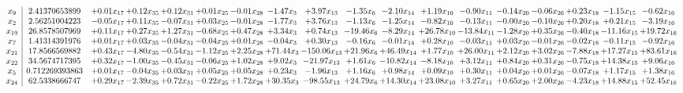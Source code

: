 \documentclass[9pt]{article}
\begin{document}
 \[\begin{array}{c| c c@{\hskip 2pt} c@{\hskip 2pt} c@{\hskip 2pt} c@{\hskip 2pt} c@{\hskip 2pt} c@{\hskip 2pt} c@{\hskip 2pt} c@{\hskip 2pt} c@{\hskip 2pt} c@{\hskip 2pt} c@{\hskip 2pt} c@{\hskip 2pt} c@{\hskip 2pt} c@{\hskip 2pt} c@{\hskip 2pt} c@{\hskip 2pt} }
 x_{9}   &  2.41370653899 & +  0.01 x_{17} & +  0.12 x_{35} & +  0.12 x_{31} & +  0.01 x_{25} & -0.01 x_{28} & -1.47 x_{3} & +  3.97 x_{13} & -1.35 x_{6} & -2.10 x_{14} & +  1.19 x_{10} & -0.90 x_{11} & -0.14 x_{20} & -0.06 x_{26} & +  0.23 x_{18} & -1.15 x_{15} & -0.62 x_{16}\\
 x_{2}   &  2.56251004223 & -0.05 x_{17} & +  0.11 x_{35} & -0.07 x_{31} & +  0.03 x_{25} & -0.01 x_{28} & -1.77 x_{3} & +  3.76 x_{13} & -1.13 x_{6} & -1.25 x_{14} & -0.82 x_{10} & -0.13 x_{11} & -0.00 x_{20} & -0.10 x_{26} & +  0.20 x_{18} & +  0.21 x_{15} & -3.19 x_{16}\\
 x_{19}   &  26.8578507969 & +  0.11 x_{17} & +  0.27 x_{35} & +  1.27 x_{31} & -0.68 x_{25} & +  0.47 x_{28} & +  3.34 x_{3} & +  0.74 x_{13} & -19.46 x_{6} & -8.29 x_{14} & + 26.78 x_{10} & -13.84 x_{11} & -1.28 x_{20} & +  0.35 x_{26} & -0.40 x_{18} & -11.16 x_{15} & + 19.72 x_{16}\\
 x_{7}   &  1.41314391976 & +  0.01 x_{17} & +  0.03 x_{35} & -0.04 x_{31} & -0.04 x_{25} & +  0.01 x_{28} & -0.04 x_{3} & +  0.30 x_{13} & -0.16 x_{6} & -0.01 x_{14} & +  0.28 x_{10} & -0.03 x_{11} & +  0.03 x_{20} & -0.01 x_{26} & -0.02 x_{18} & -0.11 x_{15} & -0.92 x_{16}\\
 x_{21}   &  17.8566569882 & +  0.43 x_{17} & -4.80 x_{35} & -0.54 x_{31} & -1.12 x_{25} & +  2.25 x_{28} & + 71.44 x_{3} & -150.06 x_{13} & + 21.96 x_{6} & + 46.49 x_{14} & +  1.77 x_{10} & + 26.00 x_{11} & +  2.12 x_{20} & +  3.02 x_{26} & -7.88 x_{18} & + 17.27 x_{15} & + 83.61 x_{16}\\
 x_{22}   &  34.5674717395 & +  0.32 x_{17} & -1.00 x_{35} & -0.45 x_{31} & -0.06 x_{25} & +  1.02 x_{28} & +  9.02 x_{3} & -21.97 x_{13} & +  1.61 x_{6} & -10.82 x_{14} & -8.18 x_{10} & +  3.12 x_{11} & +  0.84 x_{20} & +  0.31 x_{26} & -0.75 x_{18} & + 14.38 x_{15} & +  9.06 x_{16}\\
 x_{5}   &  0.712269393863 & +  0.01 x_{17} & -0.04 x_{35} & +  0.03 x_{31} & +  0.05 x_{25} & +  0.05 x_{28} & +  0.23 x_{3} & -1.96 x_{13} & +  1.16 x_{6} & +  0.98 x_{14} & +  0.09 x_{10} & +  0.30 x_{11} & +  0.04 x_{20} & +  0.01 x_{26} & -0.07 x_{18} & +  1.17 x_{15} & +  1.38 x_{16}\\
 x_{24}   &  62.5338666747 & +  0.29 x_{17} & -2.39 x_{35} & +  0.72 x_{31} & -0.22 x_{25} & +  1.72 x_{28} & + 30.35 x_{3} & -98.55 x_{13} & + 24.79 x_{6} & + 14.30 x_{14} & + 23.08 x_{10} & +  3.27 x_{11} & +  0.65 x_{20} & +  2.00 x_{26} & -4.23 x_{18} & + 14.88 x_{15} & + 52.45 x_{16}\\

\end{array}\]
\end{document}
